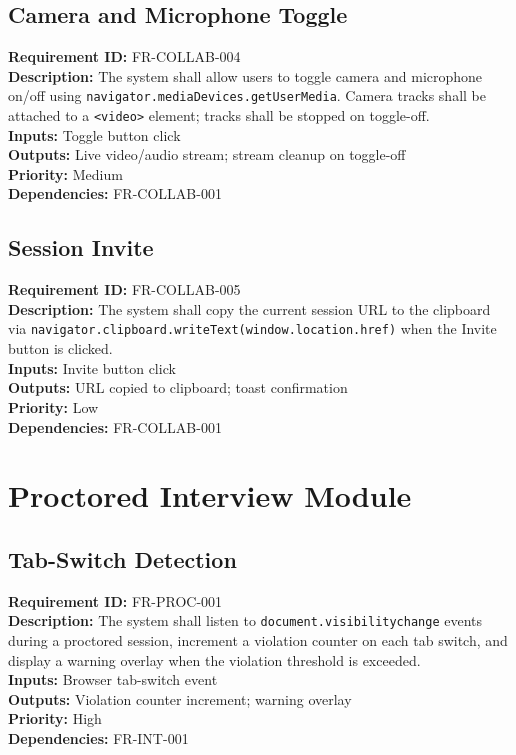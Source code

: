 \documentclass{fisatinternship}
\begin{document}
\vspace{0.4cm}

\subsection{Camera and Microphone Toggle}
\textbf{Requirement ID:} FR-COLLAB-004\\
\textbf{Description:} The system shall allow users to toggle camera and microphone on/off
using \texttt{navigator.mediaDevices.getUserMedia}. Camera tracks shall be attached to a
\texttt{<video>} element; tracks shall be stopped on toggle-off.\\
\textbf{Inputs:} Toggle button click\\
\textbf{Outputs:} Live video/audio stream; stream cleanup on toggle-off\\
\textbf{Priority:} Medium\\
\textbf{Dependencies:} FR-COLLAB-001

\vspace{0.4cm}

\subsection{Session Invite}
\textbf{Requirement ID:} FR-COLLAB-005\\
\textbf{Description:} The system shall copy the current session URL to the clipboard via
\texttt{navigator.clipboard.writeText(window.location.href)} when the Invite button is clicked.\\
\textbf{Inputs:} Invite button click\\
\textbf{Outputs:} URL copied to clipboard; toast confirmation\\
\textbf{Priority:} Low\\
\textbf{Dependencies:} FR-COLLAB-001

\vspace{0.4cm}

\section{Proctored Interview Module}

\subsection{Tab-Switch Detection}
\textbf{Requirement ID:} FR-PROC-001\\
\textbf{Description:} The system shall listen to \texttt{document.visibilitychange} events
during a proctored session, increment a violation counter on each tab switch, and display
a warning overlay when the violation threshold is exceeded.\\
\textbf{Inputs:} Browser tab-switch event\\
\textbf{Outputs:} Violation counter increment; warning overlay\\
\textbf{Priority:} High\\
\textbf{Dependencies:} FR-INT-001
\end{document}
